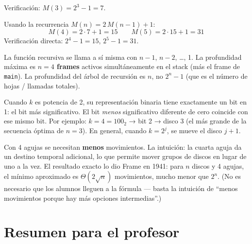 \documentclass[12pt, oneside]{article}
\begin{document}
\begin{notaprofesor}[Ejercicio 2 — $M(4)$ y $M(5)$]
  Verificación: $M(3) = 2^3 - 1 = 7$. \checkmark

  Usando la recurrencia $M(n) = 2\,M(n-1) + 1$:
  \[
    M(4) = 2 \cdot 7 + 1 = 15 \qquad M(5) = 2 \cdot 15 + 1 = 31
  \]
  Verificación directa: $2^4 - 1 = 15$, $2^5 - 1 = 31$. \checkmark
\end{notaprofesor}

\begin{notaprofesor}[Ejercicio 3 — Profundidad del call stack para $n=4$]
  La función recursiva se llama a sí misma con $n-1$, $n-2$, \ldots, 1.
  La profundidad máxima es \textbf{$n = 4$ frames} activos simultáneamente
  en el stack (más el frame de \texttt{main}).  La profundidad del árbol
  de recursión es $n$, no $2^n - 1$ (que es el número de hojas / llamadas totales).
\end{notaprofesor}

\begin{notaprofesor}
  Cuando $k$ es potencia de 2, su representación binaria tiene exactamente
  un bit en 1: el bit más significativo.  El bit \textit{menos} significativo
  diferente de cero coincide con ese mismo bit.  Por ejemplo:
  $k=4 = 100_2$ → bit 2 → disco 3 (el más grande de la secuencia óptima
  de $n=3$).  En general, cuando $k = 2^j$, se mueve el disco $j+1$.
\end{notaprofesor}

\begin{notaprofesor}
  Con 4 agujas se necesitan \textbf{menos} movimientos.  La intuición:
  la cuarta aguja da un destino temporal adicional, lo que permite
  mover grupos de discos en lugar de uno a la vez.  El resultado exacto
  lo dio Frame en 1941: para $n$ discos y 4 agujas, el mínimo aproximado
  es $\Theta(2\sqrt{n})$ movimientos, mucho menor que $2^n$.
  (No es necesario que los alumnos lleguen a la fórmula — basta la
  intuición de ``menos movimientos porque hay más opciones intermedias''.)
\end{notaprofesor}

\section{Resumen para el profesor}
\end{document}
